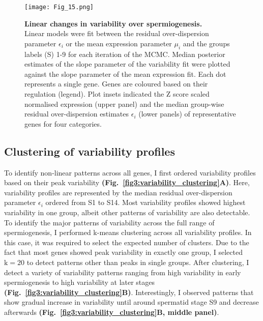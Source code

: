 \newpage

\begin{figure}[!h]
\centering
\texttt{[image: Fig\_15.png]}
\caption[Linear changes in variability over spermiogenesis]{\textbf{Linear changes in variability over spermiogenesis.}\\
Linear models were fit between the residual over-dispersion parameter $\epsilon_i$ or the mean expression parameter $\mu_i$ and the groups labels (S) 1-9 for each iteration of the MCMC. Median posterior estimates of the slope parameter of the variability fit were plotted against the slope parameter of the mean expression fit. Each dot represents a single gene. Genes are coloured based on their regulation (legend). Plot insets indicated the Z score scaled normalised expression (upper panel) and the median group-wise residual over-dispersion estimates $\epsilon_i$ (lower panels) of representative genes for four categories.}
\label{fig3:linear_variability}
\end{figure}

\newpage

\subsection{Clustering of variability profiles}

To identify non-linear patterns across all genes, I first ordered variability profiles based on their peak variability \textbf{(Fig.~\ref{fig3:variability_clustering}A)}. Here, variability profiles are represented by the median residual over-dispersion parameter $\epsilon_i$  ordered from S1 to S14. Most variability profiles showed highest variability in one group, albeit other patterns of variability are also detectable. \\

To identify the major patterns of variability across the full range of spermiogenesis, I performed k-means clustering across all variability profiles. In this case, it was required to select the expected number of clusters. Due to the fact that most genes showed peak variability in exactly one group, I selected $\text{k}=20$ to detect patterns other than peaks in single groups. After clustering, I detect a variety of variability patterns ranging from high variability in early spermiogenesis to high variability at later stages \textbf{(Fig.~\ref{fig3:variability_clustering}B)}. Interestingly, I observed patterns that show gradual increase in variability until around spermatid stage S9 and decrease afterwards \textbf{(Fig.~\ref{fig3:variability_clustering}B, middle panel)}. \\

